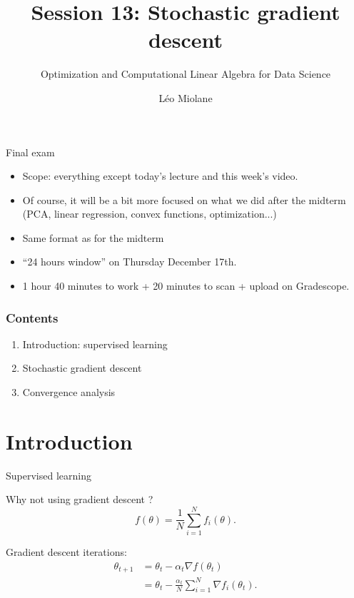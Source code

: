 \documentclass{beamer}
\title{Session 13: Stochastic gradient descent}
\subtitle{Optimization and Computational Linear Algebra for Data Science}
\author{Léo Miolane}
\date{}
\begin{document}
\setcounter{showProgressBar}{0}
\setcounter{showSlideNumbers}{0}

\frame{\titlepage}
\setcounter{framenumber}{0}
\setcounter{showSlideNumbers}{1}


\begin{frame}{Final exam}
	\begin{itemize}
		\item Scope: everything except today's lecture and this week's video.
			\vspace{2mm}
		\item Of course, it will be a bit more focused on what we did after the midterm (PCA, linear regression, convex functions, optimization...)
			\vspace{2mm}
		\item Same format as for the midterm
			\vspace{2mm}
		\item ``24 hours window'' on Thursday December 17th.
			\vspace{2mm}
		\item 1 hour 40 minutes to work + 20 minutes to scan + upload on Gradescope.
	\end{itemize}
\end{frame}

\begin{frame}
	\frametitle{Contents}
	\begin{enumerate}
		\item Introduction: supervised learning
		\item Stochastic gradient descent
		\item Convergence analysis
	\end{enumerate}
\end{frame}


\section{Introduction}


\begin{frame}[t]{Supervised learning}
	\grid

	\pause
	\pause

\end{frame}

\begin{frame}[t]{Why not using gradient descent ?}
	\grid
	$$
	f(\theta) = \frac{1}{N} \sum_{i=1}^N f_i(\theta).
	$$
	\vspace{-0.6cm}
	\begin{exampleblock}{}
		Gradient descent iterations:
\begin{align*}
	\theta_{t+1} 
	&= \theta_t - \alpha_t \nabla f(\theta_t) 
	\\
	&= \theta_t - \frac{\alpha_t}{N} \sum_{i=1}^N \nabla f_i(\theta_t).
\end{align*}
	\end{exampleblock}

\end{frame}
\end{document}
